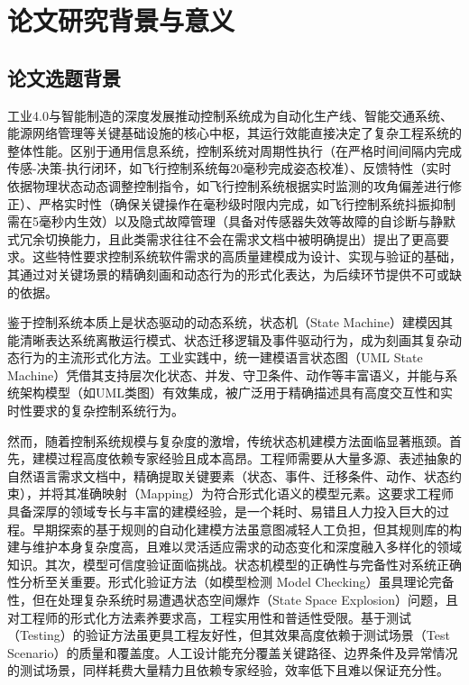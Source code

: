 \section{论文研究背景与意义}
\label{section-bg}

\subsection{论文选题背景}
\label{section-bg-paperbackground}

工业4.0与智能制造的深度发展推动控制系统成为自动化生产线、智能交通系统、能源网络管理等关键基础设施的核心中枢，其运行效能直接决定了复杂工程系统的整体性能。区别于通用信息系统，控制系统对周期性执行（在严格时间间隔内完成传感-决策-执行闭环，如飞行控制系统每20毫秒完成姿态校准）、反馈特性（实时依据物理状态动态调整控制指令，如飞行控制系统根据实时监测的攻角偏差进行修正）、严格实时性（确保关键操作在毫秒级时限内完成，如飞行控制系统抖振抑制需在5毫秒内生效）以及隐式故障管理（具备对传感器失效等故障的自诊断与静默式冗余切换能力，且此类需求往往不会在需求文档中被明确提出）提出了更高要求。这些特性要求控制系统软件需求的高质量建模成为设计、实现与验证的基础，其通过对关键场景的精确刻画和动态行为的形式化表达，为后续环节提供不可或缺的依据。

鉴于控制系统本质上是状态驱动的动态系统，状态机（State Machine）建模因其能清晰表达系统离散运行模式、状态迁移逻辑及事件驱动行为，成为刻画其复杂动态行为的主流形式化方法。工业实践中，统一建模语言状态图（UML State Machine）凭借其支持层次化状态、并发、守卫条件、动作等丰富语义，并能与系统架构模型（如UML类图）有效集成，被广泛用于精确描述具有高度交互性和实时性要求的复杂控制系统行为。

然而，随着控制系统规模与复杂度的激增，传统状态机建模方法面临显著瓶颈。首先，建模过程高度依赖专家经验且成本高昂。工程师需要从大量多源、表述抽象的自然语言需求文档中，精确提取关键要素（状态、事件、迁移条件、动作、状态约束），并将其准确映射（Mapping）为符合形式化语义的模型元素。这要求工程师具备深厚的领域专长与丰富的建模经验，是一个耗时、易错且人力投入巨大的过程。早期探索的基于规则的自动化建模方法虽意图减轻人工负担，但其规则库的构建与维护本身复杂度高，且难以灵活适应需求的动态变化和深度融入多样化的领域知识。其次，模型可信度验证面临挑战。状态机模型的正确性与完备性对系统正确性分析至关重要。形式化验证方法（如模型检测 Model Checking）虽具理论完备性，但在处理复杂系统时易遭遇状态空间爆炸（State Space Explosion）问题，且对工程师的形式化方法素养要求高，工程实用性和普适性受限。基于测试（Testing）的验证方法虽更具工程友好性，但其效果高度依赖于测试场景（Test Scenario）的质量和覆盖度。人工设计能充分覆盖关键路径、边界条件及异常情况的测试场景，同样耗费大量精力且依赖专家经验，效率低下且难以保证充分性。

